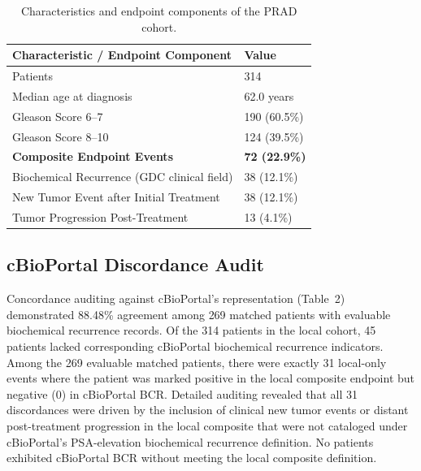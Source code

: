 \documentclass[11pt]{article}
\begin{document}
\begin{table}[H]
\centering
\caption{Characteristics and endpoint components of the PRAD cohort.}
\begin{tabular}{ll}
\toprule
Characteristic / Endpoint Component & Value \\
\midrule
Patients & 314 \\
Median age at diagnosis & 62.0 years \\
Gleason Score 6--7 & 190 (60.5\%) \\
Gleason Score 8--10 & 124 (39.5\%) \\
\midrule
\textbf{Composite Endpoint Events} & \textbf{72 (22.9\%)} \\
Biochemical Recurrence (GDC clinical field) & 38 (12.1\%) \\
New Tumor Event after Initial Treatment & 38 (12.1\%) \\
Tumor Progression Post-Treatment & 13 (4.1\%) \\
\bottomrule
\end{tabular}
\end{table}

\subsection{cBioPortal Discordance Audit}
Concordance auditing against cBioPortal's representation (Table~2) demonstrated 88.48\% agreement among 269 matched patients with evaluable biochemical recurrence records. Of the 314 patients in the local cohort, 45 patients lacked corresponding cBioPortal biochemical recurrence indicators. Among the 269 evaluable matched patients, there were exactly 31 local-only events where the patient was marked positive in the local composite endpoint but negative (0) in cBioPortal BCR. Detailed auditing revealed that all 31 discordances were driven by the inclusion of clinical new tumor events or distant post-treatment progression in the local composite that were not cataloged under cBioPortal's PSA-elevation biochemical recurrence definition. No patients exhibited cBioPortal BCR without meeting the local composite definition.
\end{document}
